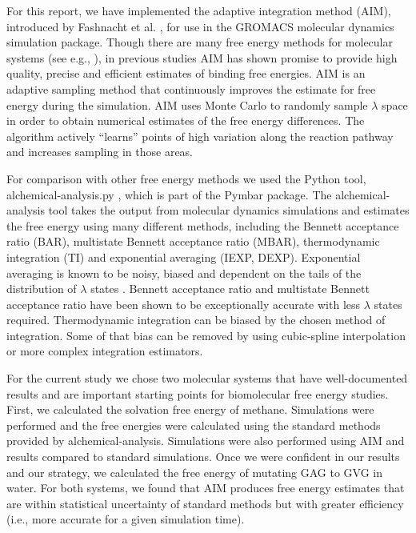 For this report, we have implemented the adaptive integration method (AIM), introduced by Fashnacht et al. \cite{Fasnacht2004}, for use in the GROMACS \cite{Berendsen1995} molecular dynamics simulation package. Though there are many free energy methods for molecular systems (see e.g., \cite{Kofke2005,Goncalves2004,Lyubartsev1996, Shirts2007,Klimovich2015,Chodera2011}), in previous studies AIM has shown promise to provide high quality, precise and efficient estimates of binding free energies\cite{Ytreberg2006}. AIM is an adaptive sampling method that continuously improves the estimate for free energy during the simulation.  AIM uses Monte Carlo to randomly sample $\lambda$ space in order to obtain numerical estimates of the free energy differences. The algorithm actively ``learns'' points of high variation along the reaction pathway and increases sampling in those areas.

For comparison with other free energy methods we used the Python tool, alchemical-analysis.py \cite{Klimovich2015}, which is part of the Pymbar \cite{Shirts2008} package. The alchemical-analysis tool takes the output from molecular dynamics simulations and estimates the free energy using many different methods, including the Bennett acceptance ratio (BAR), multistate Bennett acceptance ratio (MBAR), thermodynamic integration (TI) and exponential averaging (IEXP, DEXP). Exponential averaging is known to be noisy, biased and dependent on the tails of the distribution of $\lambda$ states \cite{Bruckner2011,Shirts2005}. Bennett acceptance ratio and multistate Bennett acceptance ratio have been shown to be exceptionally accurate with less $\lambda$ states required\cite{Shirts2005}. Thermodynamic integration can be biased by the chosen method of integration. Some of that bias can be removed by using cubic-spline interpolation or more complex integration estimators\cite{Shirts2005, Shyu2009}.

For the current study we chose two molecular systems that have well-documented results and are important starting points for biomolecular free energy studies. First, we calculated the solvation free energy of methane. Simulations were performed and the free energies were calculated using the standard methods provided by alchemical-analysis. Simulations were also performed using AIM and results compared to standard simulations. Once we were confident in our results and our strategy, we calculated the free energy of mutating GAG to GVG in water. For both systems, we found that AIM produces free energy estimates that are within statistical uncertainty of standard methods but with greater efficiency (i.e., more accurate for a given simulation time).

